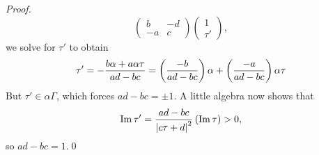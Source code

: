 \documentclass[../Moduli_Spaces_of_Riemann_Surfaces.tex]{subfiles}
\begin{document}
\begin{proof}
\begin{equation*}
\begin{pmatrix}
                b & -d \\
                -a & c
            \end{pmatrix}
            \begin{pmatrix}
                1 \\ \tau'
            \end{pmatrix},
        \end{equation*}
        we solve for $\tau'$ to obtain
        \begin{equation*}
            \tau'=-\frac{b\alpha+a\alpha\tau}{ad-bc}=\left(\frac{-b}{ad-bc}\right)\alpha+\left(\frac{-a}{ad-bc}\right)\alpha\tau
        \end{equation*}
        But $\tau'\in\alpha\Gamma$, which forces $ad-bc=\pm1$. A little algebra now shows that
        \begin{equation*}
            \operatorname{Im}\tau'=\frac{ad-bc}{\left|c\tau+d\right|^2}\left(\operatorname{Im}\tau\right)>0,
        \end{equation*}
        so $ad-bc=1$.\qed
    \end{proof}
\end{document}
